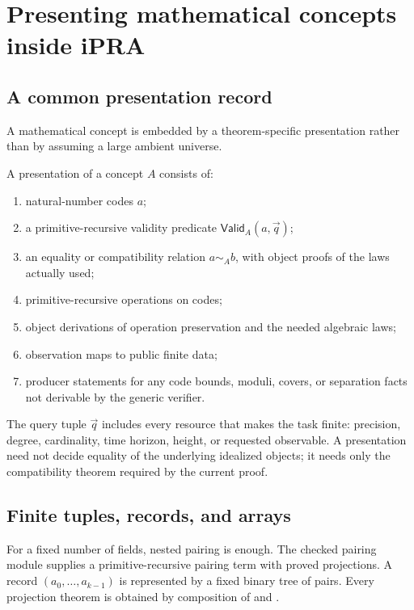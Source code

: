 \section{Presenting mathematical concepts inside iPRA}\label{sec:presentations}

\subsection{A common presentation record}

A mathematical concept is embedded by a theorem-specific presentation rather than by assuming a
large ambient universe.

\begin{definition}
A presentation of a concept \(A\) consists of:
\begin{enumerate}
\item natural-number codes \(a\);
\item a primitive-recursive validity predicate \(\mathsf{Valid}_A(a,\vec q)\);
\item an equality or compatibility relation \(a\sim_A b\), with object proofs of the laws actually
      used;
\item primitive-recursive operations on codes;
\item object derivations of operation preservation and the needed algebraic laws;
\item observation maps to public finite data;
\item producer statements for any code bounds, moduli, covers, or separation facts not derivable by
      the generic verifier.
\end{enumerate}
\end{definition}

The query tuple \(\vec q\) includes every resource that makes the task finite: precision, degree,
cardinality, time horizon, height, or requested observable.  A presentation need not decide equality
of the underlying idealized objects; it needs only the compatibility theorem required by the current
proof.

\subsection{Finite tuples, records, and arrays}

For a fixed number of fields, nested pairing is enough.  The checked pairing module supplies a
primitive-recursive pairing term with proved projections.  A record
\((a_0,\ldots,a_{k-1})\) is represented by a fixed binary tree of pairs.  Every projection theorem is
obtained by composition of  and .

